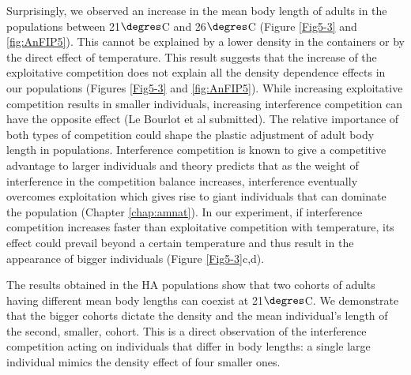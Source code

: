 Surprisingly, we observed an increase in the mean body length of adults in the
populations between 21$\degres$C and 26$\degres$C (Figure \ref{Fig5-3} and
\ref{fig:AnFIP5}). This
cannot be explained by a lower density in the containers or by the direct effect
of temperature. This result suggests that the increase of the exploitative
competition does not explain all the density dependence effects in our
populations (Figures \ref{Fig5-3} and \ref{fig:AnFIP5}). While increasing
exploitative competition results in smaller individuals, increasing interference
competition can have the opposite effect (Le Bourlot et al submitted). The
relative importance of both types of competition could shape the plastic
adjustment of adult body length in populations. Interference competition is
known to give a competitive advantage to larger individuals \autocites[and
Chapter \ref{chap:sm}]{mccormick2012a} and theory predicts that as the weight of
interference in the competition balance increases, interference eventually
overcomes exploitation which gives rise to giant individuals that can dominate
the population (Chapter \ref{chap:amnat}).
In our experiment, if interference competition increases faster than
exploitative competition with temperature, its effect could prevail beyond a
certain temperature and thus result in the appearance of bigger individuals
(Figure \ref{Fig5-3}c,d).

The results obtained in the HA populations show that two cohorts of adults
having different mean body lengths can coexist at 21$\degres$C. We demonstrate that the
bigger cohorts dictate the density and the mean individual’s length of the
second, smaller, cohort. This is a direct observation of the interference
competition acting on individuals that differ in body lengths: a single large
individual mimics the density effect of four smaller ones.


